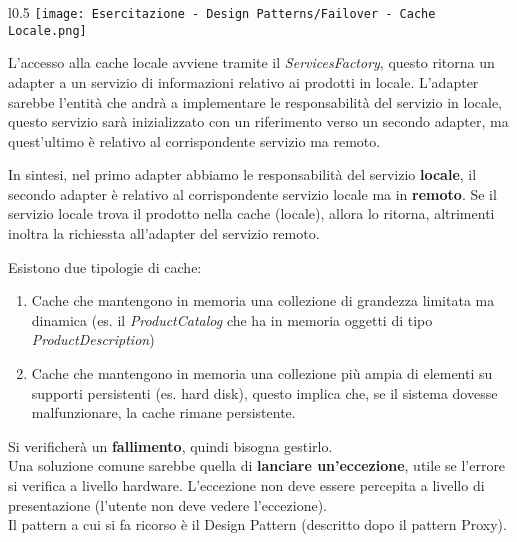 {    \newpage


    \begin{wrapfigure}{l}{0.5\textwidth}
        \texttt{[image: Esercitazione - Design Patterns/Failover - Cache Locale.png]}
    \end{wrapfigure}

    L'accesso alla cache locale avviene tramite il \textit{ServicesFactory}, questo ritorna un adapter a un servizio di 
    informazioni relativo ai prodotti in locale. L'adapter sarebbe l'entità che andrà a implementare le responsabilità del 
    servizio in locale, questo servizio sarà inizializzato con un riferimento verso un secondo adapter, ma quest'ultimo è 
    relativo al corrispondente servizio ma remoto.
    
    In sintesi, nel primo adapter abbiamo le responsabilità del servizio \textbf{locale}, il secondo adapter è relativo al corrispondente servizio
    locale ma in \textbf{remoto}. Se il servizio locale trova il prodotto nella cache (locale), allora lo ritorna, altrimenti inoltra la richiessta all'adapter
    del servizio remoto.
    
    Esistono due tipologie di cache:
    \begin{enumerate}
        \item Cache che mantengono in memoria una collezione di grandezza limitata ma dinamica (es. il \textit{ProductCatalog} che ha in memoria oggetti di tipo \textit{ProductDescription})
        \item Cache che mantengono in memoria una collezione più ampia di elementi su supporti persistenti (es. hard disk), questo implica che, se il sistema dovesse
        malfunzionare, la cache rimane persistente.
    \end{enumerate}

    \noindent {}
    Si verificherà un \textbf{fallimento}, quindi bisogna gestirlo.
    \\
    Una soluzione comune sarebbe quella di \textbf{lanciare un'eccezione}, utile se l'errore si verifica a livello hardware. L'eccezione non deve essere percepita a 
    livello di presentazione (l'utente non deve vedere l'eccezione).
    \\
    Il pattern a cui si fa ricorso è il Design Pattern  (descritto dopo il pattern Proxy).
    \newpage
}